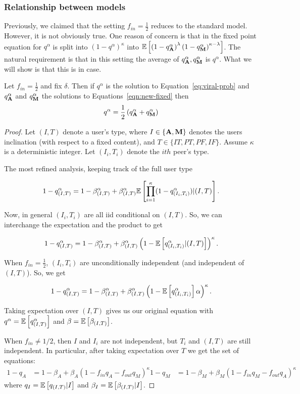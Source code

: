 \subsubsection{Relationship between models}

Previously, we claimed that the setting $f_{in} = \frac{1}{2}$ reduces to the standard model. However, it is not obviously true. One reason of concern is that in the fixed point equation for $q^\alpha$ is split into ${\left(1-q^\alpha\right)}^\kappa $ into $\mathbb{E}\left[  \left(1-q_{\mathbf{A}}^\alpha\right)^\lambda {\left(1-q_{\ensuremath{\mathbf{M}}}^\alpha\right)}^{\kappa -\lambda} \right] $. The natural requirement is that in this setting the average of $q_{\mathbf{A}}^\alpha, q_{\mathbf{M}}^\alpha$ is $q^\alpha$. What we will show is that this is in case.  
\begin{proposition}
    Let $f_{in} = \frac{1}{2}$ and fix $\delta$. Then if $q^\alpha$ is the solution to Equation~\ref{eq:viral-prob} and $q_{\mathbf{A}}^\alpha$ and $q_{\mathbf{M}}^\alpha$ the solutions to Equations~\ref{eqn:new-fixed} then 
    \[q^\alpha = \frac{1}{2} \left(q_{\mathbf{A}}^\alpha + q_{\mathbf{M}}^\alpha \right)\]
\end{proposition}
\begin{proof}
    Let $(I, T)$ denote a user's type, where $I \in \{\mathbf{A}, \mathbf{M}\}$ denotes the users inclination (with respect to a fixed content), and $T \in \{IT, PT, PF, IF\}$. Assume $\kappa$ is a deterministic integer. Let $(I_i, T_i)$ denote the $ith$ peer's type. 

    The most refined analysis, keeping track of the full user type

    \[ 1 - q_{(I,T)}^\alpha = 1 - \beta_{(I,T)}^\alpha + \beta_{(I,T)}^\alpha \mathbb{E}\left[   \prod_{i=1}^\kappa  (1 - q_{(I_i, T_i)}^\alpha )  |  (I,T) \right]. \] 

   Now, in general $(I_i, T_i)$ are all iid conditional on $(I, T)$. So, we can interchange the expectation and the product to get 

    \[ 1 - q_{(I,T)}^\alpha = 1 - \beta_{(I,T)}^\alpha + \beta_{(I,T)}^\alpha    \left(1 - \mathbb{E}\left[  q_{(I_i, T_i)}^\alpha   | (I, T)  \right] \right)^\kappa. \] 

    When $f_{in} = \frac{1}{2}$, $(I_i, T_i)$ are unconditionally independent (and independent of $(I,T)$). So, we get

     \[ 1 - q_{(I,T)}^\alpha  = 1 - \beta_{(I,T)}^\alpha  + \beta_{(I,T)}^\alpha  \left(1 - \mathbb{E}\left[  q_{(I_i, T_i)}^\alpha\right]\alpha\right)^\kappa. \]

    Taking expectation over $(I, T)$ gives us our original equation with $q^\alpha = \mathbb{E}\left[  q_{(I, T)}^\alpha\right]$ and $\beta = \mathbb{E}\left[  \beta_{(I, T)}\right]$. 

    When $f_{in} \neq 1/2$, then $I$ and $I_i$ are not independent, but $T_i$ and $(I, T)$ are still independent. In particular, after taking expectation over $T$ we get the set of equations:
    \begin{align*}
    1 - q_A &= 1 - \beta_A + \beta_A \left(1 - f_{in} q_A - f_{out} q_M\right)^\kappa 
    1 - q_M &= 1 - \beta_M + \beta_M \left(1 - f_{in} q_M - f_{out} q_A\right)^\kappa 
    \end{align*}
where $q_I = \mathbb{E}\left[  q_{(I, T)}| I \right]$ and $\beta_I = \mathbb{E}\left[  \beta_{(I,T)} | I\right]$. 
\end{proof}

